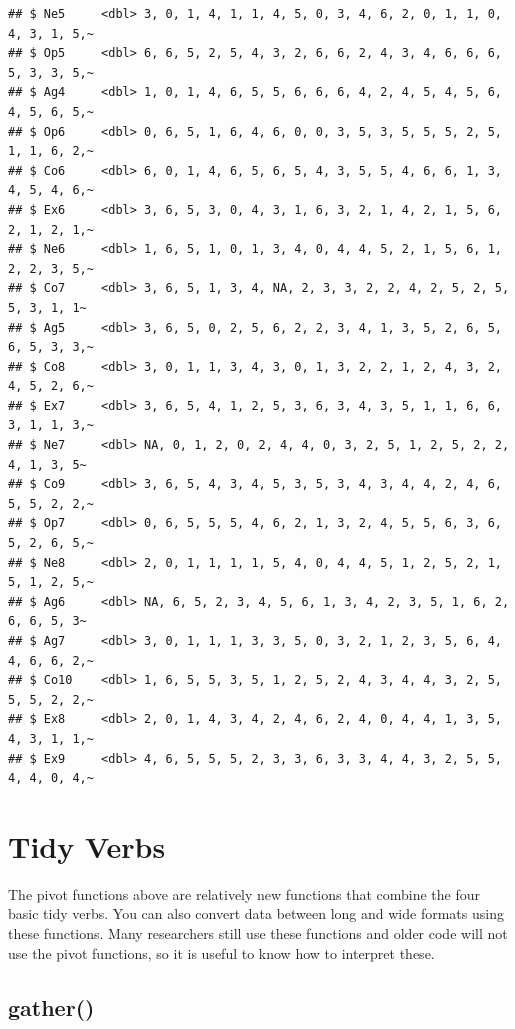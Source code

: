 \documentclass[
  oneside]{book}
\begin{document}
\begin{verbatim}
## $ Ne5     <dbl> 3, 0, 1, 4, 1, 1, 4, 5, 0, 3, 4, 6, 2, 0, 1, 1, 0, 4, 3, 1, 5,~
## $ Op5     <dbl> 6, 6, 5, 2, 5, 4, 3, 2, 6, 6, 2, 4, 3, 4, 6, 6, 6, 5, 3, 3, 5,~
## $ Ag4     <dbl> 1, 0, 1, 4, 6, 5, 5, 6, 6, 6, 4, 2, 4, 5, 4, 5, 6, 4, 5, 6, 5,~
## $ Op6     <dbl> 0, 6, 5, 1, 6, 4, 6, 0, 0, 3, 5, 3, 5, 5, 5, 2, 5, 1, 1, 6, 2,~
## $ Co6     <dbl> 6, 0, 1, 4, 6, 5, 6, 5, 4, 3, 5, 5, 4, 6, 6, 1, 3, 4, 5, 4, 6,~
## $ Ex6     <dbl> 3, 6, 5, 3, 0, 4, 3, 1, 6, 3, 2, 1, 4, 2, 1, 5, 6, 2, 1, 2, 1,~
## $ Ne6     <dbl> 1, 6, 5, 1, 0, 1, 3, 4, 0, 4, 4, 5, 2, 1, 5, 6, 1, 2, 2, 3, 5,~
## $ Co7     <dbl> 3, 6, 5, 1, 3, 4, NA, 2, 3, 3, 2, 2, 4, 2, 5, 2, 5, 5, 3, 1, 1~
## $ Ag5     <dbl> 3, 6, 5, 0, 2, 5, 6, 2, 2, 3, 4, 1, 3, 5, 2, 6, 5, 6, 5, 3, 3,~
## $ Co8     <dbl> 3, 0, 1, 1, 3, 4, 3, 0, 1, 3, 2, 2, 1, 2, 4, 3, 2, 4, 5, 2, 6,~
## $ Ex7     <dbl> 3, 6, 5, 4, 1, 2, 5, 3, 6, 3, 4, 3, 5, 1, 1, 6, 6, 3, 1, 1, 3,~
## $ Ne7     <dbl> NA, 0, 1, 2, 0, 2, 4, 4, 0, 3, 2, 5, 1, 2, 5, 2, 2, 4, 1, 3, 5~
## $ Co9     <dbl> 3, 6, 5, 4, 3, 4, 5, 3, 5, 3, 4, 3, 4, 4, 2, 4, 6, 5, 5, 2, 2,~
## $ Op7     <dbl> 0, 6, 5, 5, 5, 4, 6, 2, 1, 3, 2, 4, 5, 5, 6, 3, 6, 5, 2, 6, 5,~
## $ Ne8     <dbl> 2, 0, 1, 1, 1, 1, 5, 4, 0, 4, 4, 5, 1, 2, 5, 2, 1, 5, 1, 2, 5,~
## $ Ag6     <dbl> NA, 6, 5, 2, 3, 4, 5, 6, 1, 3, 4, 2, 3, 5, 1, 6, 2, 6, 6, 5, 3~
## $ Ag7     <dbl> 3, 0, 1, 1, 1, 3, 3, 5, 0, 3, 2, 1, 2, 3, 5, 6, 4, 4, 6, 6, 2,~
## $ Co10    <dbl> 1, 6, 5, 5, 3, 5, 1, 2, 5, 2, 4, 3, 4, 4, 3, 2, 5, 5, 5, 2, 2,~
## $ Ex8     <dbl> 2, 0, 1, 4, 3, 4, 2, 4, 6, 2, 4, 0, 4, 4, 1, 3, 5, 4, 3, 1, 1,~
## $ Ex9     <dbl> 4, 6, 5, 5, 5, 2, 3, 3, 6, 3, 3, 4, 4, 3, 2, 5, 5, 4, 4, 0, 4,~
\end{verbatim}

\hypertarget{tidy-verbs}{%
\section{Tidy Verbs}\label{tidy-verbs}}

The pivot functions above are relatively new functions that combine the four basic tidy verbs. You can also convert data between long and wide formats using these functions. Many researchers still use these functions and older code will not use the pivot functions, so it is useful to know how to interpret these.

\hypertarget{gather}{%
\subsection{gather()}\label{gather}}
\end{document}
